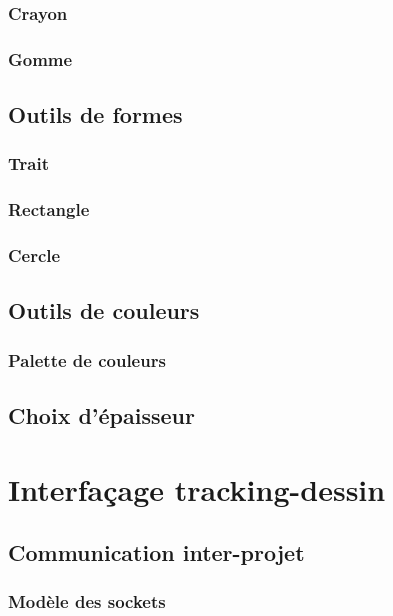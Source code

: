 \documentclass[11pt,a4paper,oldfontcommands]{memoir}
\begin{document}
\subsubsection{Crayon}

\subsubsection{Gomme}

\subsection{Outils de formes}

\subsubsection{Trait}

\subsubsection{Rectangle}

\subsubsection{Cercle}

\subsection{Outils de couleurs}

\subsubsection{Palette de couleurs}

\subsection{Choix d'épaisseur}

\section{Interfaçage tracking-dessin}

\subsection{Communication inter-projet}

\subsubsection{Modèle des sockets}
\end{document}
